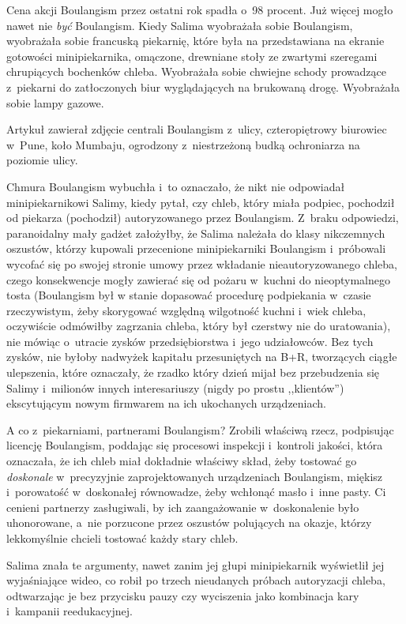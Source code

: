 \documentclass[oneside,polish,11pt,sfheadings]{mwbk}
\let\footnote=\endnote
\begin{document}
Cena akcji Boulangism przez ostatni rok spadła o~98 procent. Już więcej
mogło nawet nie \textit{być} Boulangism. Kiedy Salima wyobrażała sobie
Boulangism, wyobrażała sobie francuską piekarnię, które była na
przedstawiana na ekranie gotowości minipiekarnika, omączone, drewniane
stoły ze zwartymi szeregami chrupiących bochenków chleba. Wyobrażała
sobie chwiejne schody prowadzące z~piekarni do zatłoczonych biur
wyglądających na brukowaną drogę. Wyobrażała sobie lampy gazowe.

Artykuł zawierał zdjęcie centrali Boulangism z~ulicy, czteropiętrowy
biurowiec w~Pune, koło Mumbaju, ogrodzony z~niestrzeżoną budką
ochroniarza na poziomie ulicy.

Chmura Boulangism wybuchła i~to oznaczało, że nikt nie odpowiadał
minipiekarnikowi Salimy, kiedy pytał, czy chleb, który miała podpiec,
pochodził od piekarza (pochodził) autoryzowanego przez Boulangism. Z~braku odpowiedzi, paranoidalny mały gadżet założyłby, że Salima należała
do klasy nikczemnych oszustów, którzy kupowali przecenione
minipiekarniki Boulangism i~próbowali wycofać się po swojej stronie
umowy przez wkładanie nieautoryzowanego chleba, czego konsekwencje mogły
zawierać się od pożaru w~kuchni do nieoptymalnego tosta (Boulangism był
w stanie dopasować procedurę podpiekania w~czasie rzeczywistym, żeby
skorygować względną wilgotność kuchni i~wiek chleba, oczywiście
odmówiłby zagrzania chleba, który był czerstwy nie do uratowania), nie
mówiąc o~utracie zysków przedsiębiorstwa i~jego udziałowców. Bez tych
zysków, nie byłoby nadwyżek kapitału przesuniętych na B+R\footnote{oryg. R\&D,
badania i~rozwój -- przyp.tłum.}, tworzących ciągłe ulepszenia, które
oznaczały, że rzadko który dzień mijał bez przebudzenia się Salimy i~milionów innych interesariuszy (nigdy po prostu ,,klientów'')
ekscytującym nowym firmwarem na ich ukochanych urządzeniach.

A co z~piekarniami, partnerami Boulangism? Zrobili właściwą rzecz,
podpisując licencję Boulangism, poddając się procesowi inspekcji i~kontroli jakości, która oznaczała, że ich chleb miał dokładnie właściwy
skład, żeby tostować go \textit{doskonale} w~precyzyjnie zaprojektowanych
urządzeniach Boulangism, miękisz i~porowatość w~doskonałej równowadze,
żeby wchłonąć masło i~inne pasty. Ci cenieni partnerzy zasługiwali, by
ich zaangażowanie w~doskonalenie było uhonorowane, a~nie porzucone przez
oszustów polujących na okazje, którzy lekkomyślnie chcieli tostować
każdy stary chleb.

Salima znała te argumenty, nawet zanim jej głupi minipiekarnik
wyświetlił jej wyjaśniające wideo, co robił po trzech nieudanych próbach
autoryzacji chleba, odtwarzając je bez przycisku pauzy czy wyciszenia
jako kombinacja kary i~kampanii reedukacyjnej.
\end{document}
